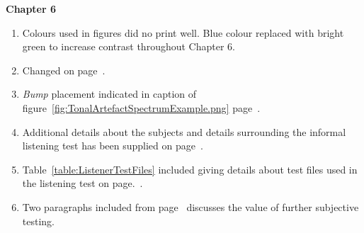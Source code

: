 \textbf{Chapter 6}
\begin{enumerate}
\item Colours used in figures did no print well. Blue colour replaced with bright green to increase contrast throughout Chapter 6.
\item Changed on page~\pageref{eq:RestBasicModel}.
\item \emph{Bump} placement indicated in caption of figure~\ref{fig:TonalArtefactSpectrumExample.png} page~\pageref{fig:TonalArtefactSpectrumExample.png}.
\item Additional details about the subjects and details surrounding the informal listening test has been supplied on page~\pageref{corrections:subjects}.
\item Table~\ref{table:ListenerTestFiles} included giving details about test files used in the listening test on page.~\pageref{table:ListenerTestFiles}.
\item Two paragraphs included from page~\pageref{corrections:conclusionSubjective} discusses the value of further subjective testing.
\end{enumerate} 